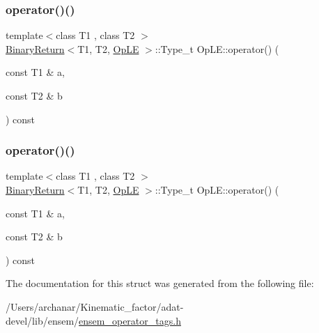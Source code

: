 \mbox{\label{structOpLE_a59addad5005738f86a6d4a5216c9348f}} 
\subsubsection{\texorpdfstring{operator()()}{operator()()}\hspace{0.1cm}{\footnotesize\ttfamily [2/3]}}
{\footnotesize\ttfamily template$<$class T1 , class T2 $>$ \\
\mbox{\hyperlink{structBinaryReturn}{Binary\+Return}}$<$T1, T2, \mbox{\hyperlink{structOpLE}{Op\+LE}} $>$\+::Type\+\_\+t Op\+L\+E\+::operator() (\begin{DoxyParamCaption}\item[{const T1 \&}]{a,  }\item[{const T2 \&}]{b }\end{DoxyParamCaption}) const\hspace{0.3cm}{\ttfamily [inline]}}

\mbox{\label{structOpLE_a59addad5005738f86a6d4a5216c9348f}} 
\subsubsection{\texorpdfstring{operator()()}{operator()()}\hspace{0.1cm}{\footnotesize\ttfamily [3/3]}}
{\footnotesize\ttfamily template$<$class T1 , class T2 $>$ \\
\mbox{\hyperlink{structBinaryReturn}{Binary\+Return}}$<$T1, T2, \mbox{\hyperlink{structOpLE}{Op\+LE}} $>$\+::Type\+\_\+t Op\+L\+E\+::operator() (\begin{DoxyParamCaption}\item[{const T1 \&}]{a,  }\item[{const T2 \&}]{b }\end{DoxyParamCaption}) const\hspace{0.3cm}{\ttfamily [inline]}}



The documentation for this struct was generated from the following file\+:\begin{DoxyCompactItemize}
\item 
/\+Users/archanar/\+Kinematic\+\_\+factor/adat-\/devel/lib/ensem/\mbox{\hyperlink{adat-devel_2lib_2ensem_2ensem__operator__tags_8h}{ensem\+\_\+operator\+\_\+tags.\+h}}\end{DoxyCompactItemize}

